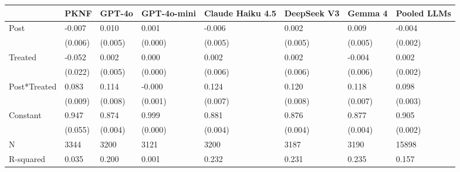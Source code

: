 \begin{tabular}{llllllll}
\toprule
 & PKNF & GPT-4o & GPT-4o-mini & Claude Haiku 4.5 & DeepSeek V3 & Gemma 4 & Pooled LLMs \\
\midrule
Post & -0.007 & 0.010 & 0.001 & -0.006 & 0.002 & 0.009 & -0.004 \\
 & (0.006) & (0.005) & (0.000) & (0.005) & (0.005) & (0.005) & (0.002) \\
Treated & -0.052 & 0.002 & 0.000 & 0.002 & 0.002 & -0.004 & 0.002 \\
 & (0.022) & (0.005) & (0.000) & (0.006) & (0.006) & (0.006) & (0.002) \\
Post*Treated & 0.083 & 0.114 & -0.000 & 0.124 & 0.120 & 0.118 & 0.098 \\
 & (0.009) & (0.008) & (0.001) & (0.007) & (0.008) & (0.007) & (0.003) \\
Constant & 0.947 & 0.874 & 0.999 & 0.881 & 0.876 & 0.877 & 0.905 \\
 & (0.055) & (0.004) & (0.000) & (0.004) & (0.004) & (0.004) & (0.002) \\
N & 3344 & 3200 & 3121 & 3200 & 3187 & 3190 & 15898 \\
R-squared & 0.035 & 0.200 & 0.001 & 0.232 & 0.231 & 0.235 & 0.157 \\
\bottomrule
\end{tabular}

